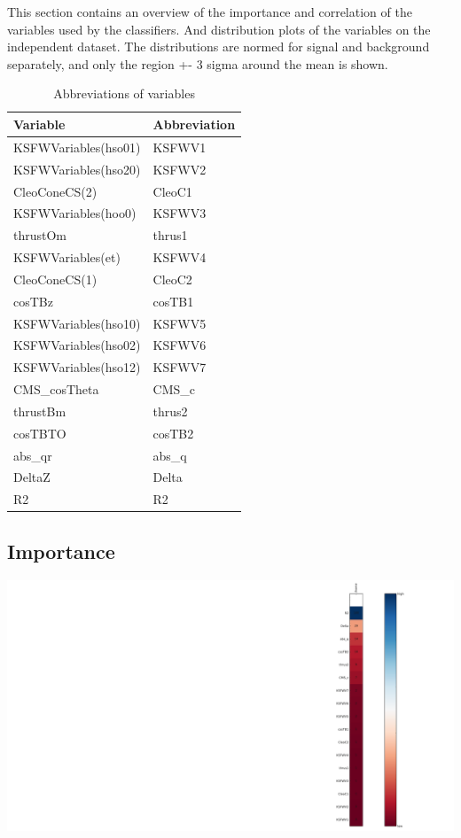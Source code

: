 \documentclass[10pt,a4paper]{article}
\begin{document}
            This section contains an overview of the importance and correlation of the variables used by the classifiers.
            And distribution plots of the variables on the independent dataset. The distributions are normed for signal and
            background separately, and only the region +- 3 sigma around the mean is shown.
        \begin{center}
\begin{longtable}{ll}
\caption{Abbreviations of variables}\\
\toprule
Variable & Abbreviation\\
\midrule
KSFWVariables(hso01) & KSFWV1\\
KSFWVariables(hso20) & KSFWV2\\
CleoConeCS(2) & CleoC1\\
KSFWVariables(hoo0) & KSFWV3\\
thrustOm & thrus1\\
KSFWVariables(et) & KSFWV4\\
CleoConeCS(1) & CleoC2\\
cosTBz & cosTB1\\
KSFWVariables(hso10) & KSFWV5\\
KSFWVariables(hso02) & KSFWV6\\
KSFWVariables(hso12) & KSFWV7\\
CMS\_cosTheta & CMS\_c\\
thrustBm & thrus2\\
cosTBTO & cosTB2\\
abs\_qr & abs\_q\\
DeltaZ & Delta\\
R2 & R2\\
\bottomrule
\end{longtable}
\end{center}
\subsection{Importance}
\begin{center}
\includegraphics[width=1.0\textwidth]{importance.pdf}
\end{center}
\end{document}
